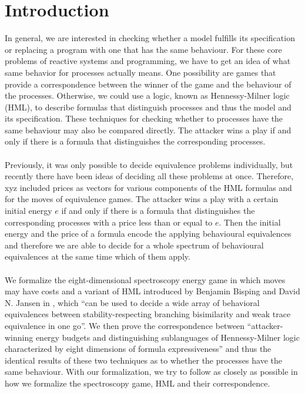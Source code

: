 \newpage
\section{Introduction} %
In general, we are interested in checking whether a model fulfills its specification or replacing a program with one that has the same behaviour.
For these core problems of reactive systems and programming, we have to get an idea of what same behavior for processes actually means.
One possibility are games that provide a correspondence between the winner of the game and the behaviour of the processes.
Otherwise, we could use a logic, known as Hennessy-Milner logic (HML), to describe formulas that distinguish processes and thus the model and its specification.
These techniques for checking whether to processes have the same behaviour may also be compared directly.
The attacker wins a play if and only if there is a formula that distinguishes the corresponding processes.
\\\\
Previously, it was only possible to decide equivalence problems individually, but recently there have been ideas of deciding all these problems at once.
Therefore, xyz included prices as vectors for various components of the HML formulas and for the moves of equivalence games.
The attacker wins a play with a certain initial energy $e$ if and only if there is a formula that distinguishes the corresponding processes with a price less than or equal to $e$.
Then the initial energy and the price of a formula encode the applying behavioural equivalences and therefore we are able to decide for a whole spectrum of behavioural equivalences at the same time which of them apply.
\\\\
We formalize the eight-dimensional spectroscopy energy game in which moves may have costs and a variant of HML introduced by Benjamin Bisping and David N. Jansen in \cite{bisping2023lineartimebranchingtime}, 
which ``can be used to decide a wide array of behavioral equivalences between stability-respecting branching bisimilarity and weak trace equivalence in one go''\cite{bisping2023lineartimebranchingtime}.
We then prove the correspondence between ``attacker-winning energy budgets and distinguishing sublanguages of Hennessy-Milner logic characterized by eight dimensions of formula expressiveness'' 
and thus the identical results of these two techniques as to whether the processes have the same behaviour.
With our formalization, we try to follow \cite{bisping2023lineartimebranchingtime} as closely as possible in how we formalize the spectroscopy game, HML and their correspondence.
